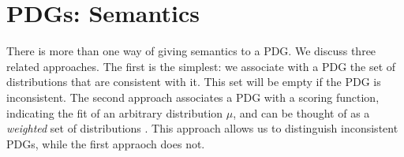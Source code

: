 \documentclass{article}
\theoremstyle{plain}
\theoremstyle{definition}
\theoremstyle{remark}
\newcommand{\modelname}{probabilistic dependency graph}
\newcommand{\modelnames}{\modelname s}
\newcommand{\MN}{PDG}
\newcommand{\MNs}{\MN s}
\numberwithin{equation}{section}
\begin{document}
        \section{PDGs: Semantics}\label{sec:semantics}

	There is more than one way of giving semantics to a \MN.  We discuss three related approaches.
	The first is the simplest: we associate with a PDG the set of distributions that are consistent with it. This set will be empty if the PDG is inconsistent.
	The second approach associates a PDG with a scoring function,
        indicating the fit of an arbitrary distribution $\mu$, and can
        be thought of as a \emph{weighted} set of distributions
\cite{HL12}.
This approach allows us to distinguish inconsistent PDGs, while the first
appraoch does not.        
\end{document}

